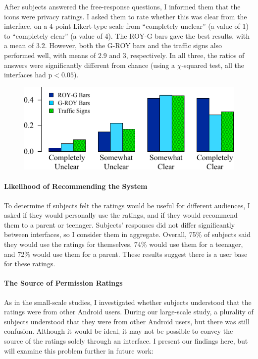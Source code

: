 \documentclass[11pt]{article}
\begin{document}
After subjects answered the free-response questions, I informed them that 
the icons were privacy ratings. I asked them to rate whether this was 
clear from the interface, on a 4-point Likert-type scale from ``completely 
unclear'' (a value of 1) to ``completely clear'' (a value of 4).
The ROY-G bars gave the best results, with a mean of 3.2.
However, both the G-ROY bars and the traffic signs also performed well,
with means of 2.9 and 3, respectively. In all three, the ratios of answers were 
significantly different from chance (using a $\chi$-squared test, all the interfaces had 
$\mathrm{p}< 0.05$).
\begin{figure}[h]
\centering
    \includegraphics[width=.5\linewidth]{graphs/ClarityHistLikert.png}
    \label{likert}
\end{figure}

\paragraph{Likelihood of Recommending the System}
\label{ssec-est-usage}

To determine if subjects felt the ratings would be useful for 
different audiences, I asked if 
they would personally use the ratings, and if
they would recommend them to a parent or
teenager. Subjects' responses did not 
differ significantly between interfaces, so I consider 
them in aggregate. Overall, 75\% of subjects said they would use the
ratings for themselves, 
74\% would use them for a teenager, and 72\% would use them for a parent. 
These results suggest there is a user base for these ratings.

\paragraph{The Source of Permission Ratings}
\label{s-source}

As in the small-scale studies, I investigated whether subjects understood 
that the ratings were from other Android users.
During 
our large-scale study, a plurality of subjects understood that they were from other 
Android users, but there was still confusion. 
Although it would be ideal, it may not be possible to convey the 
source of the ratings solely through an interface.
I present our findings here, but will examine this problem further 
in future work: 
\end{document}
